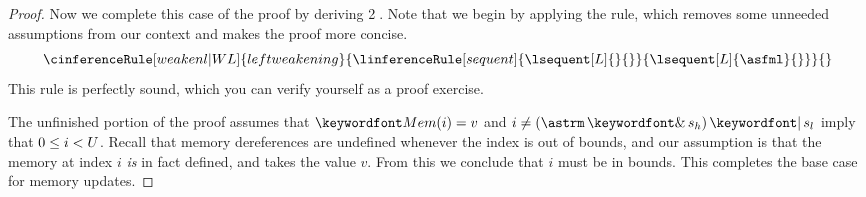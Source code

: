 \documentclass[11pt,twoside]{scrartcl}
\begin{document}
\begin{proof}
Now we complete this case of the proof by deriving \textcircled{2}.
Note that we begin by applying the  rule, which removes some unneeded assumptions from our context and makes the proof more concise.
\[
\cinferenceRule[weakenl|W\leftrule]{left weakening}
{\linferenceRule[sequent]
  {\lsequent[L]{}{}}
  {\lsequent[L]{\asfml}{}}
}{}%
\]
This rule is perfectly sound, which you can verify yourself as a proof exercise.
\begin{sequentdeduction}
 {
}
\end{sequentdeduction}
The unfinished portion of the proof assumes that $\pderef{i}=v$ and $i \ne (\astrm \bitand s_h) \bitor s_l$ imply that $0 \le i < U$. Recall that memory dereferences are undefined whenever the index is out of bounds, and our assumption is that the memory at index $i$ \emph{is} in fact defined, and takes the value $v$. From this we conclude that $i$ must be in bounds. This completes the base case for memory updates.


\end{proof}
\end{document}
